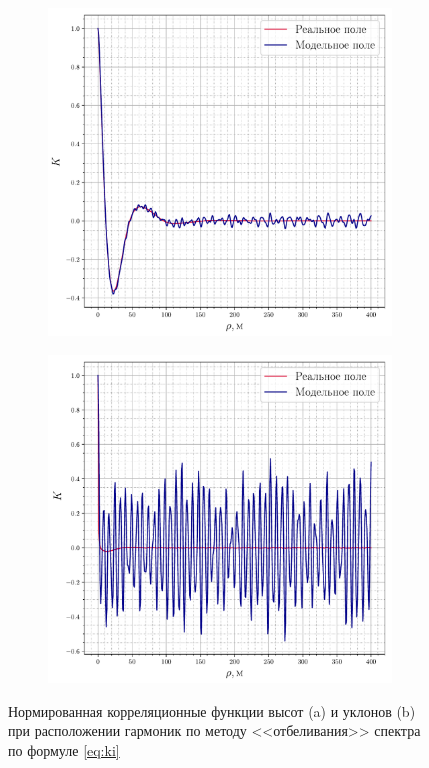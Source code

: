 \begin{figure}[ht]
    \centering
    \begin{subfigure}{0.49\linewidth}
        \centering
        \includegraphics[width=\linewidth]{fig/correlation_height_height2.pdf}
        \caption{}
    \end{subfigure}
    \begin{subfigure}{0.49\linewidth}
        \centering
        \includegraphics[width=\linewidth]{fig/correlation_angles_height2.pdf}
        \caption{}
    \end{subfigure}
    \caption{ Нормированная корреляционные функции высот (a) и уклонов (b) при расположении гармоник
    по методу <<отбеливания>> спектра по формуле \eqref{eq:ki} }
    \label{fig:ki}
\end{figure}

